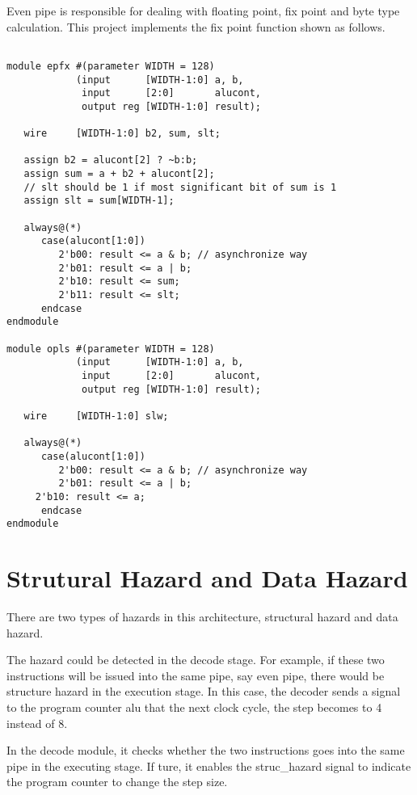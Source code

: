 \documentclass[preprint,authoryear,12pt]{elsarticle}
\begin{document}
Even pipe is responsible for dealing with floating point, fix point
and byte type calculation. This project implements the fix point function shown as follows.

\begin{verbatim}

module epfx #(parameter WIDTH = 128)
            (input      [WIDTH-1:0] a, b, 
             input      [2:0]       alucont, 
             output reg [WIDTH-1:0] result);

   wire     [WIDTH-1:0] b2, sum, slt;

   assign b2 = alucont[2] ? ~b:b; 
   assign sum = a + b2 + alucont[2];
   // slt should be 1 if most significant bit of sum is 1
   assign slt = sum[WIDTH-1];

   always@(*)
      case(alucont[1:0])
         2'b00: result <= a & b; // asynchronize way
         2'b01: result <= a | b;
         2'b10: result <= sum;
         2'b11: result <= slt;
      endcase
endmodule

module opls #(parameter WIDTH = 128)
            (input      [WIDTH-1:0] a, b, 
             input      [2:0]       alucont, 
             output reg [WIDTH-1:0] result);

   wire     [WIDTH-1:0] slw;
   
   always@(*)
      case(alucont[1:0])
         2'b00: result <= a & b; // asynchronize way
         2'b01: result <= a | b;
	 2'b10: result <= a;
      endcase
endmodule

\end{verbatim}

\section{Strutural Hazard and Data Hazard}

There are two types of hazards in this architecture, structural
hazard and data hazard.

The hazard could be detected in the decode stage. For example, if
these two instructions will be issued into the same pipe, say even
pipe, there would be structure hazard in the execution stage. In this
case, the decoder sends a signal to the program counter alu that the
next clock cycle, the step becomes to 4 instead of 8.

In the decode module, it checks whether the two instructions goes into
the same pipe in the executing stage. If ture, it enables the
struc\_hazard signal to indicate the program counter to change the
step size.
\end{document}
